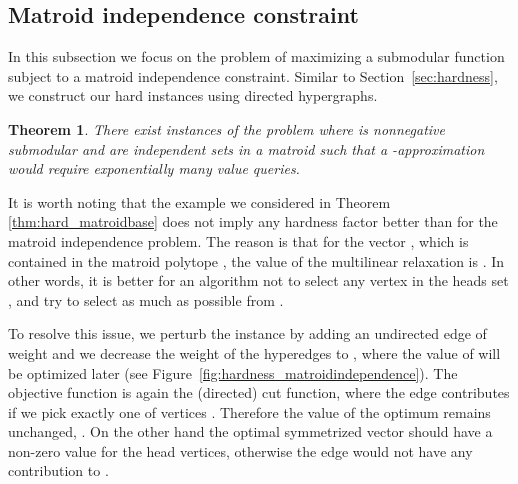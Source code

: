 \documentclass{article}[11pt]
\newtheorem{theorem}{Theorem}[section]
\begin{document}
\subsection{Matroid independence constraint}
\label{subsec:matroidindependence}

In this subsection we focus on the problem of maximizing a submodular
function subject to a matroid independence constraint.
Similar to Section~\ref{sec:hardness},
we construct our hard instances using directed hypergraphs.

\begin{theorem}
\label{thm:hard_matroidindependence}
There exist instances of the problem 
where  is nonnegative submodular and  are independent sets in a matroid
such that a -approximation would require exponentially many value queries.
\end{theorem}

It is worth noting that the example we considered in Theorem \ref{thm:hard_matroidbase}
does not imply any hardness factor better than  for the matroid independence problem.
The reason is that for the vector , which is contained
in the matroid polytope , the value of the multilinear relaxation is .
In other words, it is better for an algorithm not to select any vertex in the heads set ,
and try to select as much as possible from . 


\medskip
{} To resolve this issue,
we perturb the instance by adding an undirected edge  of weight 
and we decrease the weight of the hyperedges to , where the value of 
will be optimized later (see Figure~\ref{fig:hardness_matroidindependence}).
The objective function is again the (directed) cut function, where the edge 
contributes  if we pick exactly one of vertices .
Therefore the value of the optimum remains unchanged, .
On the other hand the optimal symmetrized vector  should have a non-zero
value for the head vertices, otherwise the edge  would not have any
contribution to .\\
\end{document}

